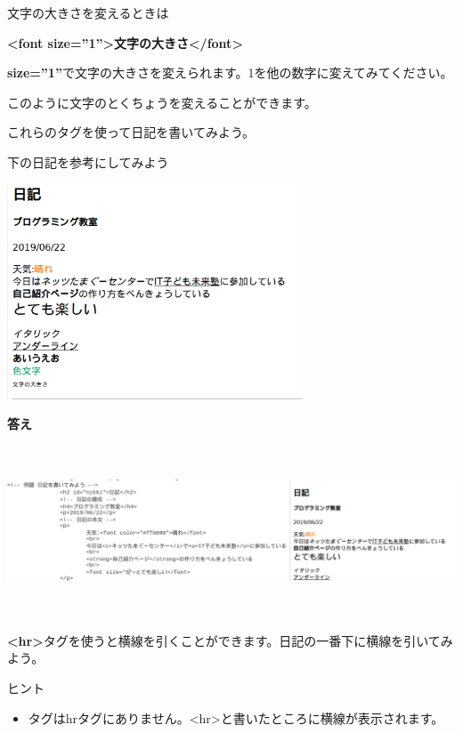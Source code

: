\documentclass[a4paper,12pt]{jarticle}
\begin{document}
文字の大きさを変えるときは

\textbf{{\textless}font size=”1”{\textgreater}文字の大きさ{\textless}/font{\textgreater}}

\textbf{size=”1”}で文字の大きさを変えられます。1を他の数字に変えてみてください。

このように文字のとくちょうを変えることができます。


\bigskip

これらのタグを使って日記を書いてみよう。

下の日記を参考にしてみよう


\bigskip

\includegraphics[width=8.779cm,height=6.412cm]{textbook-img185.png}

\clearpage
\textbf{答え}



\includegraphics[width=16.163cm,height=5.057cm]{textbook-img188.png}

\theQuestion\label{Q:hasAnswer04-8}
\textbf{{\textless}hr{\textgreater}}タグを使うと横線を引くことができます。日記の一番下に横線を引いてみよう。

ヒント

\begin{itemize}
  \item
        タグはhrタグにありません。{\textless}hr{\textgreater}と書いたところに横線が表示されます。
\end{itemize}
\theQuestion\label{Q:hasAnswer04-9}
\end{document}
